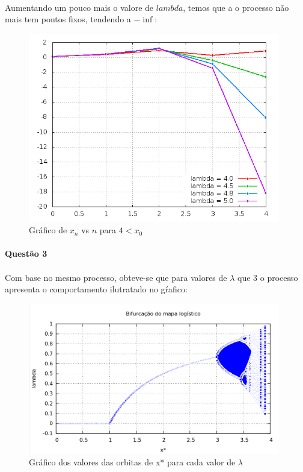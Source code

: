 \documentclass[a4paper,11pt]{article}
\begin{document}
\paragraph{}Aumentando um pouco mais o valore de $lambda$, temos que a o processo não mais tem pontos fixos, tendendo a $-\inf$:

\begin{figure}[H]
\includegraphics[width=11cm]{../image/questao2b3.png}
\centering
\caption{Gráfico de $x_n$ vs $n$ para $4<x_0$}
\end{figure}

\paragraph{Questão 3}
\paragraph{}Com base no mesmo processo, obteve-se que para valores de $\lambda$ que 3 o processo apresenta o comportamento ilutratado no gŕafico:
\begin{figure}[H]
\includegraphics[width=11cm]{../image/questao3b.png}
\centering
\caption{Gráfico dos valores das orbitas de x* para cada valor de $\lambda$}
\end{figure}
\end{document}
